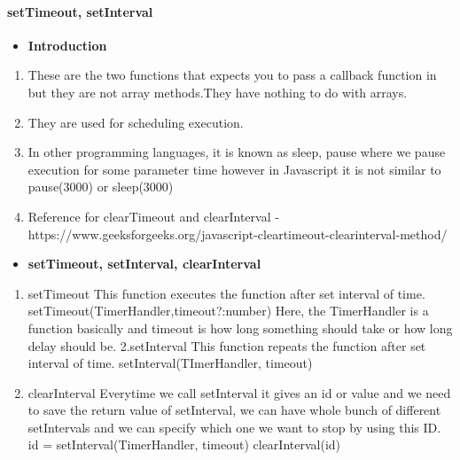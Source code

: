 \documentclass[
  paper=a4,
  ,captions=tableheading
]{scrartcl}
\providecommand{\tightlist}{%
  \setlength{\itemsep}{0pt}\setlength{\parskip}{0pt}}
\begin{document}
\hypertarget{settimeout-setinterval}{%
\paragraph{setTimeout, setInterval}\label{settimeout-setinterval}}

\begin{itemize}
\tightlist
\item
  \textbf{Introduction}
\end{itemize}

\begin{enumerate}
\def\labelenumi{\arabic{enumi}.}
\tightlist
\item
  These are the two functions that expects you to pass a callback
  function in but they are not array methods.They have nothing to do
  with arrays.
\item
  They are used for scheduling execution.
\item
  In other programming languages, it is known as sleep, pause where we
  pause execution for some parameter time however in Javascript it is
  not similar to pause(3000) or sleep(3000)
\item
  Reference for clearTimeout and clearInterval -
  https://www.geeksforgeeks.org/javascript-cleartimeout-clearinterval-method/
\end{enumerate}

\begin{itemize}
\tightlist
\item
  \textbf{setTimeout, setInterval, clearInterval}
\end{itemize}

\begin{enumerate}
\def\labelenumi{\arabic{enumi}.}
\tightlist
\item
  setTimeout This function executes the function after set interval of
  time. setTimeout(TimerHandler,timeout?:number) Here, the TimerHandler
  is a function basically and timeout is how long something should take
  or how long delay should be. 2.setInterval This function repeats the
  function after set interval of time. setInterval(TImerHandler,
  timeout)
\item
  clearInterval Everytime we call setInterval it gives an id or value
  and we need to save the return value of setInterval, we can have whole
  bunch of different setIntervals and we can specify which one we want
  to stop by using this ID. id = setInterval(TimerHandler, timeout)
  clearInterval(id)
\end{enumerate}
\end{document}
